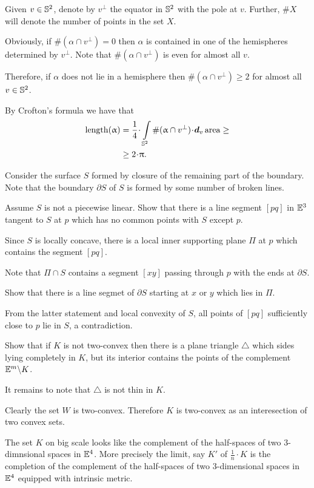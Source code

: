 Given $v\in \SS^2$, denote by $v^\perp$ the equator in $\mathbb{S}^2$ with the pole at $v$.
Further, $\# X$ will denote the number of points in the set $X$.

Obviously,  if $\#(\alpha\cap v^\perp) =0$ then $\alpha$ is contained in one of the hemispheres determined by $v^\perp$. 
Note that $\#(\alpha\cap v^\perp)$ is even for almost all $v$.

Therefore, if $\alpha$ does not lie in a hemisphere then
$\#(\alpha\cap v^\perp) \ge 2$ for almost all $v\in\SS^2$.  

By Crofton's formula we have that
\begin{align*}
\length(\alpha)
&=\frac 1 4\cdot \int\limits_{\SS^2}\#(\alpha\cap v^\perp)\cdot \d_v\area\ge
\\
&\ge2\cdot\pi.
\end{align*}
\qedsf

Consider the surface $S$ 
formed by closure of the remaining part of the boundary.
Note that the boundary $\partial S$ of $S$ is formed by some number of broken lines.

Assume $S$ is not a piecewise linear.
Show that there is a line segment $[pq]$ in $\mathbb{E}^3$ tangent to $S$ at $p$ which has no common points with $S$ except $p$.

Since $S$ is locally concave,
there is a local inner supporting plane $\Pi$ at $p$ which contains the segment $[pq]$.

Note that $\Pi\cap S$ contains a segment $[xy]$ passing through $p$ with the ends at $\partial S$.

Show that there is a line segmet of $\partial S$ starting at $x$ or $y$ which lies in $\Pi$.

From the latter statement and local convexity of $S$, 
all points of $[pq]$ sufficiently close to $p$ lie in $S$,
a contradiction.
\qeds


Show that if $K$ is not two-convex then there is a plane triangle $\triangle$ which sides lying completely in $K$, 
but its interior contains the points of the complement $\mathbb{E}^m\backslash K$.

It remains to note that $\triangle$ is not thin in $K$.
\qeds

Clearly the set $W$ is two-convex.
Therefore $K$ is two-convex as an interesection of two convex sets.

The set $K$ on big scale looks like the complement of the half-spaces of two 3-dimnsional spaces in $\mathbb{E}^4$.
More precisely the limit, say $K'$ of $\tfrac1n\cdot K$ is 
the completion of the complement of the half-spaces of two 3-dimensional spaces in $\mathbb{E}^4$ equipped with intrinsic metric.

